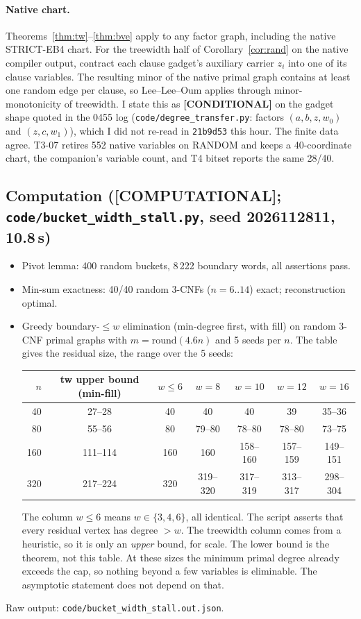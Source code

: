 \documentclass[11pt]{article}
\theoremstyle{definition}
\theoremstyle{remark}
\newcommand{\lab}[1]{\textbf{[#1]}}
\begin{document}
\paragraph{Native chart.} Theorems~\ref{thm:tw}--\ref{thm:bve} apply to any factor graph,
including the native STRICT-EB4 chart. For the treewidth half of Corollary~\ref{cor:rand}
on the native compiler output, contract each clause gadget's auxiliary carrier $z_i$
into one of its clause variables. The resulting minor of the native primal graph contains
at least one random edge per clause, so Lee--Lee--Oum applies through minor-monotonicity
of treewidth. I state this as \lab{CONDITIONAL} on the gadget shape quoted in the 0455
log (\texttt{code/degree\_transfer.py}: factors $(a,b,z,w_0)$ and $(z,c,w_1)$), which I did
not re-read in \texttt{21b9d53} this hour. The finite data agree. T3-07 retires
552 native variables on RANDOM and keeps a 40-coordinate chart, the companion's variable
count, and T4 bitset reports the same 28/40.

\subsection{Computation (\lab{COMPUTATIONAL}; \texttt{code/bucket\_width\_stall.py}, seed 2026112811, 10.8\,s)}
\begin{itemize}
\item[(A)] Pivot lemma: 400 random buckets, 8\,222 boundary words, all assertions pass.
\item[(B)] Min-sum exactness: 40/40 random 3-CNFs ($n=6..14$) exact; reconstruction optimal.
\item[(C)] Greedy boundary-$\le w$ elimination (min-degree first, with fill) on random 3-CNF
primal graphs with $m=\mathrm{round}(4.6n)$ and 5 seeds per $n$. The table gives the
residual size, the range over the 5 seeds:
\begin{center}
\begin{tabular}{rcccccc}
$n$ & tw upper bound (min-fill) & $w\le6$ & $w=8$ & $w=10$ & $w=12$ & $w=16$\\\hline
40 & 27--28 & 40 & 40 & 40 & 39 & 35--36\\
80 & 55--56 & 80 & 79--80 & 78--80 & 78--80 & 73--75\\
160 & 111--114 & 160 & 160 & 158--160 & 157--159 & 149--151\\
320 & 217--224 & 320 & 319--320 & 317--319 & 313--317 & 298--304
\end{tabular}
\end{center}
The column $w\le6$ means $w\in\{3,4,6\}$, all identical. The script asserts that every
residual vertex has degree $>w$. The treewidth column comes from a heuristic, so it is
only an \emph{upper} bound, for scale. The lower bound is the theorem, not this table. At
these sizes the minimum primal degree already exceeds the cap, so nothing beyond a few
variables is eliminable. The asymptotic statement does not depend on that.
\end{itemize}
Raw output: \texttt{code/bucket\_width\_stall.out.json}.
\end{document}

